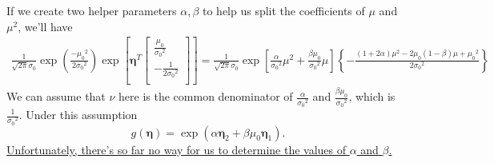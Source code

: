 \documentclass[12pt]{article}
\begin{document}
If we create two helper parameters $\alpha,\beta$ to help us split the coefficients of $\mu$ and $\mu^2$, we'll have
\begin{equation}
    \begin{split}
        \frac{1}{\sqrt{2 \pi} \sigma_{0}}\exp{\left(\frac{-{\mu_0}^2}{2{\sigma_0}^2}\right)}\exp{\left[\boldsymbol{\eta}^T\begin{bmatrix}
                    \frac{\mu_0}{{\sigma_0}^2} \\
                    -\frac{1}{2{\sigma_0}^2}   \\
                \end{bmatrix}\right]}
        =\frac{1}{\sqrt{2 \pi} \sigma_{0}}\exp{\left[\frac{\alpha}{{\sigma_0}^2}{\mu}^2+\frac{\beta\mu_0}{{\sigma_0}^2}\mu\right]\left\{-\frac{(1+2\alpha)\mu^2-2{\mu_0}(1-\beta)\mu+{\mu_0}^2}{2{\sigma_0}^2}\right\}}
    \end{split}
\end{equation}
We can assume that $\nu$ here is the common denominator of $\frac{\alpha}{{\sigma_0}^2}$ and $\frac{\beta\mu_0}{{\sigma_0}^2}$, which is $\frac{1}{{\sigma_0}^2}$. Under this assumption $$g(\boldsymbol{\eta})=\exp(\alpha{\boldsymbol{\eta}}_2+\beta\mu_0{\boldsymbol{\eta}}_1).$$
\ul{Unfortunately, there's so far no way for us to determine the values of $\alpha$ and $\beta$.}
\end{document}

